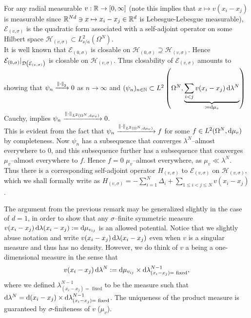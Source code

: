 \begin{remark} \label{RemarkdDimPotentialAllowed}
	For any radial measurable $ v:\mathbb{R}\to [0,\infty] $ (note this implies that $ x\mapsto v(x_i-x_j) $ is measurable since $ \mathbb{R}^{Nd} \ni x\mapsto x_i-x_j\in \mathbb{R}^d $ is Lebesgue-Lebesgue measurable),  $\mathcal{E}_{(v,\sigma)} $ is the quadratic form associated with a self-adjoint operator on some Hilbert space $ \mathcal{H}_{(v,\sigma)}\subset L^2_{s/a}(\Omega^N) $.\\
	It is well known that $\mathcal{E}_{(0,\sigma)}$ is closable on $ \mathcal{H}_{(0,\sigma)}\supseteq \mathcal{H}_{(v,\sigma)}    $. Hence $ \mathcal{E}_{(0,\sigma)}\lvert_{\mathcal D\left(\mathcal{E}_{(v,\sigma)}\right)} $ is closable on $  \mathcal{H}_{(v,\sigma)} $. Thus closability of $ \mathcal{E}_{(v,\sigma)} $ amounts to showing that $ \psi_n \xrightarrow{\left\lVert \cdot \right\rVert_2}0 $ as $ n\to\infty $ and $ (\psi_n)_{n\in\mathbb{N}}\subset L^2\left(\Omega^N,\underbrace{\sum_{i<j}v(x_i-x_j)\mathop{}\!\mathrm{d}\lambda^{N}}_{\coloneqq \mathop{}\!\mathrm{d}\mu_v}\right) $ Cauchy, implies $ \psi_n\xrightarrow{\left\lVert \cdot \right\rVert_{L^2(\Omega^N,\mathop{}\!\mathrm{d}\mu_v)}}0  $. \\
	This is evident from the fact that $\psi_n\xrightarrow{\left\lVert \cdot \right\rVert_{L^2(\Omega^N,\mathop{}\!\mathrm{d}\mu_v)}}f$ for some $ f\in L^2(\Omega^N,\mathop{}\!\mathrm{d}\mu_v) $ by completeness. Now $ \psi_n $ has a subsequence that converges $ \lambda^{N} $--almost everywhere to $ 0 $, and this subsequence further has a subsequence that converges $ \mu_v $--almost everywhere to $ f $. Hence $ f=0 $ $ \mu_v $--almost everywhere, as $ \mu_v\ll \lambda^N $. \\
	Thus there is a corresponding self-adjoint operator $ H_{(v,\sigma)} $ to $ \mathcal{E}_{(v,\sigma)} $ on $ \mathcal{H}_{(v,\sigma)} $, which we shall formally write as $ H_{(v,\sigma)}=-\sum_{i=1}^{N}\Delta_i+\sum_{1\leq i<j\leq N}v(x_i-x_j) $.
\end{remark}
The argument from the previous remark may be generalized slightly in the case of $ d=1 $, in order to show that any $ \sigma $--finite symmetric measure $ v(x_i-x_j)\mathop{}\!\mathrm{d}\lambda(x_i-x_j):=\mathop{}\!\mathrm{d}\mu_{v_{ij}} $ is an allowed potential. Notice that we slightly abuse notation and write $  v(x_i-x_j)\mathop{}\!\mathrm{d}\lambda(x_i-x_j) $ even when $ v $ is a singular measure and thus has no density. However, we do think of $ v $ a being a one-dimensional measure in the sense that 
$$ v(x_i-x_j)\mathop{}\!\mathrm{d}\lambda^N:=\mathop{}\!\mathrm{d}\mu_{v_{ij}}\times \mathop{}\!\mathrm{d} \lambda^{N-1}_{(x_i-x_j)=\text{ fixed}},  $$ 
where we defined $ \lambda^{N-1}_{(x_i-x_j)=\text{ fixed}} $ to be the measure such that $ \mathop{}\!\mathrm{d}\lambda^{N}=\mathop{}\!\mathrm{d}(x_i-x_j)\times \mathop{}\!\mathrm{d}\lambda^{N-1}_{(x_i-x_j)=\text{ fixed}} $. The uniqueness of the product measure is guaranteed by $ \sigma $-finiteness of $ v $ ($ \mu_v $).
